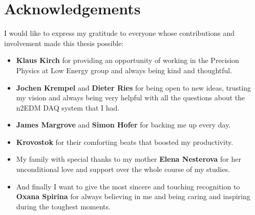 \chapter{Acknowledgements}

I would like to express my gratitude to everyone whose contributions and involvement made this thesis possible:

\begin{itemize}
	\item \textbf{Klaus Kirch} for providing an opportunity of working in the Precision Physics at Low Energy group and always being kind and thoughtful.
	\item \textbf{Jochen Krempel} and \textbf{Dieter Ries} for being open to new ideas, trusting my vision and always being very helpful with all the questions about the n2EDM DAQ system that I had.
	\item \textbf{James Margrove} and \textbf{Simon Hofer} for backing me up every day.
	\item \textbf{Krovostok} for their comforting beats that boosted my productivity.
	\item My family with special thanks to my mother \textbf{Elena Nesterova} for her unconditional love and support over the whole course of my studies.
	\item And finally I want to give the most sincere and touching recognition to \textbf{Oxana Spirina} for always believing in me and being caring and inspiring during the toughest moments.
\end{itemize}
